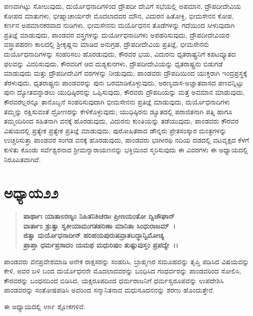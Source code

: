 ಪಣವಾಗಿಟ್ಟು ಸೋಲುವುದು, ದುರ್ಯೊಧನಾದಿಗಳಿಂದ ದ್ರೌಪದೀ ದೇವಿಗೆ ಸಭೆಯಲ್ಲಿ ಅಪಮಾನ, ದ್ರೌಪದೀದೇವಿಯ ಕೋಪದ ಮಾತುಗಳು, ಭೀಷ್ಮಾಚಾರ್ಯರೇ ಮೊದಲಾದವರ ಮೌನ, ವಿದುರನ ಹಿತೋಕ್ತಿ, ಭೀಮಸೇನನ ಕೋಪ, ಕರ್ಣನ ಅಪಮಾನಕರವಾದ ನುಡಿಗಳು, ಭೀಮಸೇನನು ದುರ್ಯೊಧನನ ತೊಡೆಗಳನ್ನು ಗದೆಯಿಂದ ಸೀಳುವುದಾಗಿ ಪ್ರತಿಜ್ಞೆ ಮಾಡುವುದು, ಪಾಂಡವರ ವಸ್ತ್ರಗಳನ್ನು ದುರ್ಯೋಧನಾದಿಗಳು ಅಪಹರಿಸುವುದು, ದ್ರೌಪದೀದೇವಿಯರ ವಸ್ತ್ರಾಪಹರಣ ಕಾಲದಲ್ಲಿ ಶ‍್ರೀಕೃಷ್ಣನು ಮಾಡಿದ ಅನುಗ್ರಹ, ದ್ರೌಪದೀದೇವಿಯ ಪ್ರತಿಜ್ಞೆ, ಭೀಮಸೇನನು ದುರ್ಯೊಧನಾದಿಗಳನ್ನು ಸಂಹರಿಸಲು ಹೊರಡುವುದು, ಕೌರವರ ಭಯ, ವಿದುರನು ಧೃತರಾಷ್ಟ್ರನಿಗೆ ಕಪಟವ್ಯೂತದ ಫಲವನ್ನು ವಿವರಿಸುವುದು, ಕೌರವರಿಗೆ ಆದ ದುಶ್ಯಕುನಗಳು, ದ್ರೌಪದೀದೇವಿಯನ್ನು ಧೃತರಾಷ್ಟ್ರನು ಬಿಡುಗಡೆ ಮಾಡುವುದು ಮತ್ತು ದ್ರೌಪದೀದೇವಿಗೆ ವರಗಳನ್ನು ನೀಡುವುದು, ಪಾಂಡವರು ದ್ರೌಪದಿಯಿಂದ ಯುಕ್ತರಾಗಿ ಇಂದ್ರಪ್ರಸ್ಥಕ್ಕೆ ತೆರಳುವುದು, ಧೃತರಾಷ್ಟ್ರನು ಪಾಂಡವರನ್ನು ಪುನಃ ಬರಮಾಡಿಕೊಳ್ಳುವುದು, ಅರಣ್ಯವಾಸ-ಅಜ್ಞಾತವಾಸದ ಪಣವನ್ನಿಟ್ಟು ಪುನಃ ದ್ಯೋತವನ್ನಾಡಲು ಯುಧಿಷ್ಠಿರನನ್ನು ಒಪ್ಪಿಸುವುದು, ಕೌರವರು ದ್ರೌಪದಿಯನ್ನು ಮತ್ತೆ ಅವಮಾನ ಮಾಡುವುದು, ಕೌರವರೆಲ್ಲರನ್ನೂ ತಾನೊಬ್ಬನೆ ಸಂಹರಿಸುವುದಾಗಿ ಭೀಮಸೇನನು ಪ್ರತಿಜ್ಞೆ ಮಾಡುವುದು, ದುರ್ಯೊಧನಾದಿಗಳು ತಮ್ಮನ್ನು ರಕ್ಷಿಸುವಂತೆ ದ್ರೋಣರನ್ನು ಕೇಳಿಕೊಳ್ಳುವುದು, ಯುಧಿಷ್ಠಿರನು ಡ್ಯೂತದಲ್ಲಿ ಪರಾಜಿತನಾಗಿ ಪತ್ನಿ ಹಾಗೂ ತಮ್ಮಂದಿರಿಂದ ಸಹಿತನಾಗಿ ವನಕ್ಕೆ ಹೊರಡುವುದು, ವಿದುರನು ಕುಂತಿಯನ್ನು ತಡೆಯುವುದು, ಪಾಂಡವರು ಕೌರವರ ವಿಷಯದಲ್ಲಿ ಪ್ರತ್ಯೇಕ ಪ್ರತ್ಯೇಕ ಪ್ರತಿಜ್ಞೆ ಮಾಡುವುದು, ಪುರೋಹಿತರಾದ ಡೌನ್ನರು ಪ್ರೇತಸಂಸ್ಕಾರ ಮಂತ್ರಗಳನ್ನು ಉಚ್ಚರಿಸುತ್ತಾ ಪಾಂಡವರ ಸಂಗಡ ವನಕ್ಕೆ ಹೊರಡುವುದು, ಪಾಂಡವರು ಭಾಗೀರಥಿ ನದಿಯ ದಡದಲ್ಲಿ ವಟವೃಕ್ಷದ ಕೆಳಗೆ ಕುಳಿತು ಕೊಂಡು ಸರ್ವೆಶ್ವರನಾದ ಶ‍್ರೀಮನ್ನಾರಾಯಣನನ್ನು ಭಕ್ತಿಯಿಂದ ಸ್ಮರಿಸುವುದು ಈ ವಿವರಗಳು ಈ ಅಧ್ಯಾಯದಲ್ಲಿ ನಿರೂಪಿತವಾಗಿವೆ.


\section*{ಅಧ್ಯಾಯ\enginline{-}೨೨}

\begin{verse}
\textbf{ಪಾರ್ಥಾಃ ಯಾತಾಽರಣ್ಯಂ ನಿಹಿತನಿಶಿಚರಾಃ ಪ್ರೀಣಯಂತೋ ದ್ವಿಜೌಘಾನ್}\\\textbf{ವಾರ್ತಾಂ ಶ್ರುತ್ವಾ ಸ್ವಕೀಯಾಮುಗತಹರಿಣಾ ಮಾನಿತಾ ಸಿಂಧುರಾಜಮ್~।}\\\textbf{ ಜಿತ್ವಾ ದುರ್ಯೊಧನಾದೀನ್ ಹರಿಹಯಪುರುಷವ್ರಾತಬದ್ಧಾನ್ವಿಮೋಚ್ಯ}\\\textbf{ ಪ್ರಾಪ್ತಾ ಧರ್ಮಪ್ರಸಾದಂ ಯಮಥ ಮಧುರಿಪುಂ ತುಷ್ಟುವುಸ್ತಂ ಪ್ರಪದ್ಯೇ~।।}
\end{verse}

ಪಾಂಡವರು ವನಪ್ರವೇಶಮಾಡಿ ಅನೇಕ ರಾಕ್ಷಸರನ್ನು ಸಂಹರಿಸಿ, ಬ್ರಾಹ್ಮಣರ ಸಮೂಹವನ್ನು ತೃಪ್ತಿ ಪಡಿಸಿದ ವಿಷಯವನ್ನು ಕೇಳಿ, ಅವರ ಬಳಿ ಬಂದ ದುರ್ಯೊಧನನೇ ಮೊದಲಾದವರನ್ನು ಬಂಧಿಸಿದ ಗಂಧರ್ವರನ್ನು ಪಾಂಡವರಿಂದ ಸೋಲಿಸಿ, ಕೌರವರನ್ನು ಬಂಧನದಿಂದ ಬಿಡಿಸಿದ, ಯಕ್ಷರೂಪದಿಂದ ಧರ್ಮರಾಜನಿಗೆ ಧರ್ಮಸ್ವರೂಪವನ್ನು ಉಪದೇಶಿಸಿ ಪಾಂಡವರನ್ನು ಸಂತೋಷಪಡಿಸಿ ಅವರಿಂದ ಸನ್ಮಾನಿತನಾದ ಮಧುಸೂದನನನ್ನು ಶರಣು ಹೊಂದುತ್ತೇನೆ.

ಈ ಅಧ್ಯಾಯದಲ್ಲಿ ೪೫೯ ಶ್ಲೋಕಗಳಿವೆ.

